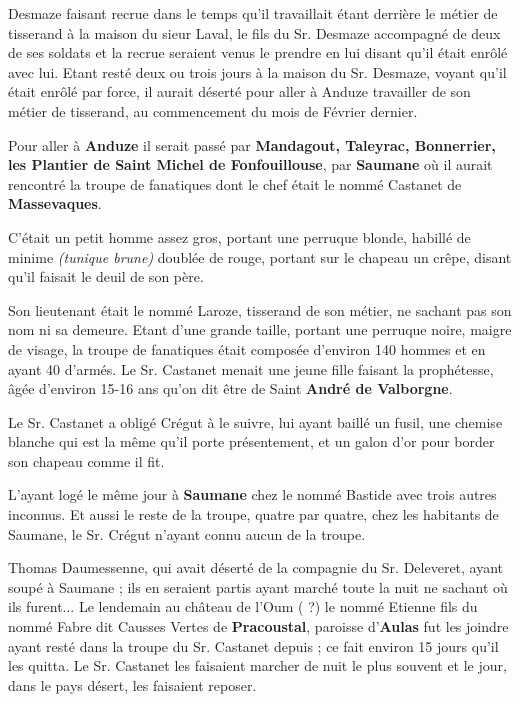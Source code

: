 

Desmaze faisant recrue dans le temps qu’il travaillait étant derrière le métier de tisserand à la maison du sieur Laval, le fils du Sr. Desmaze accompagné de deux de ses soldats et la recrue seraient venus le prendre en lui disant qu’il était enrôlé avec lui. Etant resté deux ou trois jours à la maison du Sr. Desmaze, voyant qu’il était enrôlé par force, il aurait déserté pour aller à Anduze travailler de son métier de tisserand, au commencement du mois de Février dernier.

Pour aller à \textbf{Anduze} il serait passé par \textbf{Mandagout, Taleyrac, Bonnerrier, les Plantier de Saint Michel de Fonfouillouse}, par \textbf{Saumane} où il aurait rencontré la troupe de fanatiques dont le chef était le nommé Castanet de \textbf{Massevaques}.

C’était un petit homme assez gros, portant une perruque blonde, habillé de minime \textit{(tunique brune)} doublée de rouge, portant sur le chapeau un crêpe, disant qu’il faisait le deuil de son père.

Son lieutenant était le nommé Laroze, tisserand de son métier, ne sachant pas son nom ni sa demeure. Etant d’une grande taille, portant une perruque noire, maigre de visage, la troupe de fanatiques était composée d’environ 140 hommes et en ayant 40 d’armés. Le Sr. Castanet menait une jeune fille faisant la prophétesse, âgée d’environ 15-16 ans qu’on dit être de Saint \textbf{André de Valborgne}.

Le Sr. Castanet a obligé Crégut à le suivre, lui ayant baillé un fusil, une chemise blanche qui est la même qu’il porte présentement, et un galon d’or pour border son chapeau comme il fit.

L’ayant logé le même jour à \textbf{Saumane} chez le nommé Bastide avec trois autres inconnus. Et aussi le reste de la troupe, quatre par quatre, chez les habitants de Saumane, le Sr. Crégut n’ayant connu aucun de la troupe.

Thomas Daumessenne, qui avait déserté de la compagnie du Sr. Deleveret, ayant soupé à Saumane ; ils en seraient partis ayant marché toute la nuit ne sachant où ils furent... Le lendemain au château de l’Oum ( ?) le nommé Etienne fils du nommé Fabre dit Causses Vertes de \textbf{Pracoustal}, paroisse d’\textbf{Aulas} fut les joindre ayant resté dans la troupe du Sr. Castanet depuis ; ce fait environ 15 jours qu’il les quitta. Le Sr. Castanet les faisaient marcher de nuit le plus souvent et le jour, dans le pays désert, les faisaient reposer.

